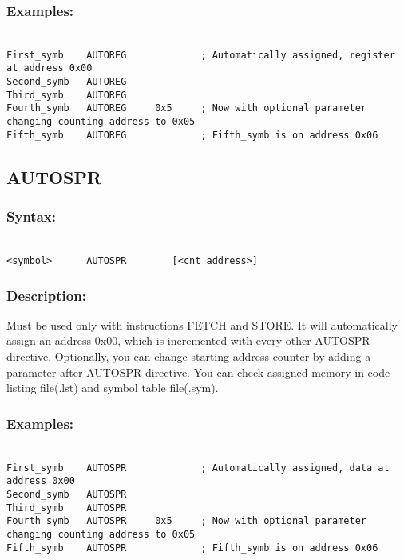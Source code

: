        \subsubsection{Examples:}
            {
                ~\\
                \usecodefont
                \verb'First_symb    AUTOREG             ; Automatically assigned, register at address 0x00'\\
                \verb'Second_symb   AUTOREG'\\
                \verb'Third_symb    AUTOREG'\\
                \verb'Fourth_symb   AUTOREG     0x5     ; Now with optional parameter changing counting address to 0x05'\\
                \verb'Fifth_symb    AUTOREG             ; Fifth_symb is on address 0x06'\\
            }

    \subsection{AUTOSPR}
        \subsubsection{Syntax:}
        {
            ~\\
            \usecodefont
            \verb'<symbol>      AUTOSPR        [<cnt address>]'
        }

    \subsubsection{Description:}
    Must be used only with instructions FETCH and STORE. It will automatically assign an
    address 0x00, which is incremented with every other AUTOSPR directive. Optionally, you can change starting address counter by adding a parameter
    after AUTOSPR directive. You can check assigned memory in code listing file(.lst) and symbol table file(.sym).

    \subsubsection{Examples:}
        {
            ~\\
            \usecodefont
            \verb'First_symb    AUTOSPR             ; Automatically assigned, data at address 0x00'\\
            \verb'Second_symb   AUTOSPR'\\
            \verb'Third_symb    AUTOSPR'\\
            \verb'Fourth_symb   AUTOSPR     0x5     ; Now with optional parameter changing counting address to 0x05'\\
            \verb'Fifth_symb    AUTOSPR             ; Fifth_symb is on address 0x06'\\
        }

